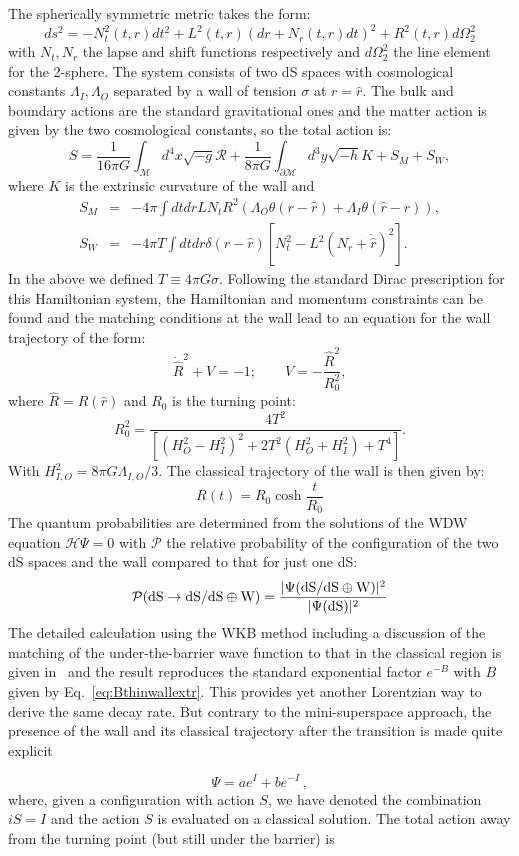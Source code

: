 \documentclass[a4paper,11pt]{article}
\numberwithin{equation}{section}
\newcommand{\bea}{\begin{eqnarray}}
\newcommand{\eea}{\end{eqnarray}}
\newcommand{\be}{\begin{equation}}
\newcommand{\ee}{\end{equation}}
\begin{document}
The spherically symmetric metric takes the form:
\be
ds^2=-N_t^2(t,r)dt^2+L^2(t,r)(dr+N_r(t,r)dt)^2+R^2(t,r)d\Omega_2^2
\ee
with $N_t,N_r$ the lapse and shift functions respectively and $d\Omega_2^2$ the line element for the 2-sphere. The system consists of two dS spaces with cosmological constants $\Lambda_I, \Lambda_O$ separated by a wall of tension $\sigma$  at $r=\hat r$. The bulk and boundary actions are the standard gravitational ones and the  matter action is given by the two cosmological constants, so the total action is:
\be
S=\frac{1}{16\pi G}\int_{\mathcal M} d^4x\sqrt{-g}\mathcal{R}+\frac{1}{8\pi G}\int_{\partial \mathcal M} d^3y\sqrt{-h} K+S_M+S_W,
\ee
where $K$ is the extrinsic curvature of the wall and
\bea
S_M &= & -4\pi  \int dt dr L N_t R^2\left(\Lambda_O\theta(r-\hat r)+ \Lambda_I \theta(\hat r-r) \right), \nonumber \\
S_W &= & -4\pi T\int dt dr \delta(r-\hat r)\left[N_t^2-L^2(N_r+\dot{\hat{r}})^2\right].
\eea
 In the above we defined $T\equiv 4\pi G\sigma$. Following the standard Dirac prescription for this Hamiltonian system, the Hamiltonian and momentum constraints can be found and the matching conditions at the wall lead to an equation for the wall trajectory of the form:
 \be
 \dot{\hat{R}}^2+V=-1; \qquad V=-\frac{\hat{R}^2}{R_0^2},
 \label{rdot}
 \ee
 where $\hat R=R(\hat r)$ and $R_0$ is the turning point:
 \be
 R_0^2=\frac{4T^2}{\left[(H_O^2-H_I^2)^2+2T^2(H_O^2+H_I^2)+T^4 \right]}.
 \ee
 With $H^2_{I,O}=8\pi G \Lambda_{I,O}/3$. The classical trajectory of the wall is then given by:
 \be
 R(t)=R_0\cosh\frac{t}{R_0}
 \ee
 The quantum probabilities are determined from the solutions of the WDW equation $\mathcal{H}\Psi=0$ with ${\mathcal P}$ the relative probability of the configuration of the two dS spaces and the wall compared to that for just one dS: 
 \be
 {\mathcal P}({\rm dS}\rightarrow{\rm dS}/\rm{dS}\oplus W)=\frac{|\Psi({\rm dS}/\rm{dS}\oplus W)|^2}{|\Psi(\rm{dS})|^2}
\ee
The detailed calculation using the WKB method including a discussion of the matching of the under-the-barrier wave function to that in the classical region is given in~\cite{deAlwis:2019dkc} and the result reproduces the standard exponential factor $e^{-B}$ with $B$ given by Eq.~\eqref{eq:Bthinwallextr}. This provides yet another Lorentzian way to derive the same decay rate. But contrary to the mini-superspace approach, the presence of the wall and its classical trajectory after the transition is made quite explicit


\begin{equation}
\label{eq:GeneralWF}
\Psi = a e^{I} + b e^{- I} \,,
\end{equation}
where, given a configuration with action $S$, we have denoted the combination $iS = I$ and the action $S$ is evaluated on a classical solution. 
The total action away from the turning point (but still under the barrier) is
\end{document}
